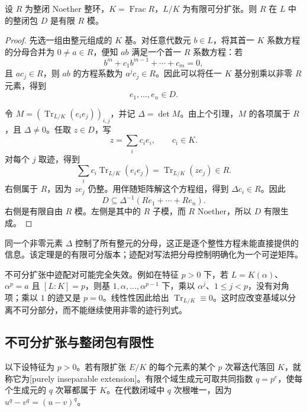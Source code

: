 \begin{theorem}\label{g5:thm:separable-integral-closure-finite}
	设 \(R\) 为整闭 Noether 整环，\(K=\operatorname{Frac}R\)，\(L/K\) 为有限可分扩张。则 \(R\) 在 \(L\) 中的整闭包 \(D\) 是有限 \(R\) 模。
\end{theorem}
\begin{proof}
	先选一组由整元组成的 \(K\) 基。对任意代数元 \(b\in L\)，将其首一 \(K\) 系数方程的分母合并为 \(0\ne a\in R\)，便知 \(ab\) 满足一个首一 \(R\) 系数方程：若
	\[
		b^m+c_1b^{m-1}+\cdots+c_m=0,
	\]
	且 \(ac_j\in R\)，则 \(ab\) 的方程系数为 \(a^jc_j\in R\)。因此可以将任一 \(K\) 基分别乘以非零 \(R\) 元素，得到
	\[
		e_1,\ldots,e_n\in D.
	\]

	令 \(M=(\operatorname{Tr}_{L/K}(e_ie_j))_{i,j}\)，并记 \(\Delta=\det M\)。由上个引理，\(M\) 的各项属于 \(R\)，且 \(\Delta\ne0\)。任取 \(z\in D\)，写
	\[
		z=\sum_i c_i e_i,\qquad c_i\in K.
	\]
	对每个 \(j\) 取迹，得到
	\[
		\sum_i c_i\operatorname{Tr}_{L/K}(e_ie_j)
		=\operatorname{Tr}_{L/K}(ze_j)\in R.
	\]
	右侧属于 \(R\)，因为 \(ze_j\) 仍整。用伴随矩阵解这个方程组，得到 \(\Delta c_i\in R\)。因此
	\begin{equation}\label{g5:eq:trace-common-denominator}
		D\subseteq\Delta^{-1}(Re_1+\cdots+Re_n).
	\end{equation}
	右侧是有限自由 \(R\) 模。左侧是其中的 \(R\) 子模，而 \(R\) Noether，所以 \(D\) 有限生成。
\end{proof}

同一个非零元素 \(\Delta\) 控制了所有整元的分母，这正是逐个整性方程未能直接提供的信息。该定理是\cite[第33节，引理1，第262页]{Matsumura1989}的有限可分版本；迹配对写法把分母控制明确化为一个可逆矩阵。

\ProseParagraphBreak

不可分扩张中迹配对可能完全失效。例如在特征 \(p>0\) 下，若 \(L=K(\alpha)\)、\(\alpha^p=a\) 且 \([L:K]=p\)，则基 \(1,\alpha,\ldots,\alpha^{p-1}\) 下，乘以 \(\alpha^j\)、\(1\leq j<p\)，没有对角项；乘以 \(1\) 的迹又是 \(p=0\)。线性性因此给出 \(\operatorname{Tr}_{L/K}\equiv0\)。这时应改变基域以分离不可分部分，而不能继续使用非零的迹行列式。

\subsection{不可分扩张与整闭包有限性}
\label{g5:subsec:0402:04}

以下设特征为 \(p>0\)。若有限扩张 \(E/K\) 的每个元素的某个 \(p\) 次幂迭代落回 \(K\)，就称它为[purely inseparable extension]。有限个域生成元可取共同指数 \(q=p^e\)，使每个生成元的 \(q\) 次幂都属于 \(K\)。在代数闭域中 \(q\) 次根唯一，因为 \(u^q-v^q=(u-v)^q\)。

